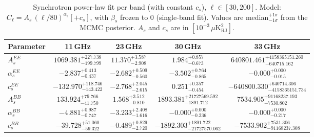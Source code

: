 \begin{table}[htbp]
\centering
\caption{Synchrotron power-law fit per band (with constant $c_s$), $\ell \in [30, 200]$. Model: $C_\ell = A_s\,(\ell/80)^{\alpha_s} [+ c_s]$, with $\beta_s$ frozen to 0 (single-band fit). Values are median$^{+1\sigma}_{-1\sigma}$ from the MCMC posterior. $A_s$ and $c_s$ are in $[10^{-3}\,\mu\mathrm{K}^2_\mathrm{RJ}]$.}
\label{tab:sync_single_band_withc_ell30-200}
\begin{tabular}{lcccc}
\toprule
Parameter & 11\,GHz & 23\,GHz & 30\,GHz & 33\,GHz \\
\midrule
$A_s^{EE}$ & $1069.381^{+227.738}_{-199.799}$ & $11.370^{+3.587}_{-2.908}$ & $1.984^{+0.857}_{-0.673}$ & $640801.461^{+4158365151.260}_{-640715.162}$ \\
$\alpha_s^{EE}$ & $-2.837^{+0.413}_{-0.437}$ & $-2.682^{+0.509}_{-0.560}$ & $-3.502^{+0.764}_{-0.865}$ & $-0.000^{+0.000}_{-0.015}$ \\
$c_s^{EE}$ & $-132.970^{+118.746}_{-143.422}$ & $-2.768^{+2.045}_{-2.615}$ & $0.251^{+0.357}_{-0.454}$ & $-640800.330^{+640714.306}_{-4158365151.734}$ \\
\midrule
$A_s^{BB}$ & $133.924^{+79.766}_{-41.750}$ & $1.568^{+3.512}_{-0.810}$ & $1893.381^{+21727569.592}_{-1891.712}$ & $7534.905^{+91168237.193}_{-7530.802}$ \\
$\alpha_s^{BB}$ & $-4.881^{+0.987}_{-0.747}$ & $-3.233^{+2.408}_{-1.616}$ & $-0.000^{+0.000}_{-0.236}$ & $-0.000^{+0.000}_{-0.217}$ \\
$c_s^{BB}$ & $-39.728^{+51.060}_{-59.322}$ & $-0.489^{+0.829}_{-2.720}$ & $-1892.303^{+1891.722}_{-21727570.062}$ & $-7533.902^{+7531.306}_{-91168237.308}$ \\
\bottomrule
\end{tabular}
\end{table}